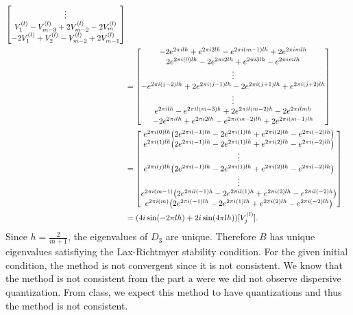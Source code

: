 \documentclass[12pt]{report}
\begin{document}
\begin{solution}
\begin{enumerate}
\begin{align*}
\begin{bmatrix}
                    \vdots\\
                    V_1^{(l)} - V_{m-3}^{(l)} + 2V_{m-2}^{(l)} - 2V_{m}^{(l)}\\
                    -2V_1^{(l)} + V_{2}^{(l)} - V_{m-2}^{(l)} + 2 V_{m-1}^{(l)}
                \end{bmatrix}\\ 
                &=\begin{bmatrix}
                    -2e^{2\pi i l h} + e^{2\pi i 2 l h} - e^{2\pi i (m-1) l h} + 2e^{2\pi i m l h}\\
                    2e^{2\pi i (0) l h} - 2e^{2\pi i 2 l h} + e^{2\pi i 3 l h} - e^{2\pi i m l h}\\
                    \vdots\\
                    -e^{2\pi i (j-2) l h} + 2e^{2\pi i (j-1) l h} - 2e^{2\pi i (j+1) l h} + e^{2\pi i (j+2) l h}\\
                    \vdots\\
                    e^{2\pi i l h} - e^{2\pi i l (m-3) h} + 2e^{2\pi i l (m-2) h} - 2e^{2\pi i l m h}\\
                    -2e^{2\pi i  l h} + e^{2\pi i 2 l h} - e^{2\pi i (m-2) l h} + 2 e^{2\pi i (m-1) l h}
                \end{bmatrix}\\
                &=\begin{bmatrix}
                    e^{2\pi i(0)lh}{\left(2e^{2\pi i (-1) l h}-2e^{2\pi i (1) l h} + e^{2\pi i (2) l h} - e^{2\pi i (-2) l h}\right)}\\
                    e^{2\pi i(1)lh}{\left(2e^{2\pi i (-1) l h} - 2e^{2\pi i (1) l h} + e^{2\pi i (2) l h} - e^{2\pi i (-2) l h}\right)}\\
                    \vdots\\
                    e^{2\pi i(j)lh}{\left(2e^{2\pi i (-1) l h} - 2e^{2\pi i (1) l h} + e^{2\pi i (2) l h}-e^{2\pi i (-2) l h}\right)}\\
                    \vdots\\
                    e^{2\pi i (m-1)}{\left(2e^{2\pi i l (-1) h} - 2e^{2\pi i l (1) h} +e^{2\pi i (2) l h} - e^{2\pi i l (-2) h}\right)}\\
                    e^{2\pi i (m)}{\left(2 e^{2\pi i (-1) l h}-2e^{2\pi i (1) l h} + e^{2\pi i (2) l h} - e^{2\pi i (-2) l h}\right)}
                \end{bmatrix}\\
                &= (4i\sin(-2\pi l h) + 2i\sin(4\pi lh))[V_j^{(l)}].
        \end{align*}
        Since $h = \frac{2}{m+1}$, the eigenvalues of $D_3$ are unique. Therefore $B$ has unique eigenvalues satisfiying the Lax-Richtmyer stability condition. For the given initial condition, the method is not convergent since it is not consistent. We know that the method is not consistent from the part a were we did not observe dispersive quantization. From class, we expect this method to have quantizations and thus the method is not consistent.  
    \end{enumerate}

\end{solution}
\end{document}
